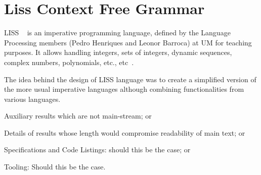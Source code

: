 \documentclass[
  oneside,
  11pt, a4paper,
  footinclude=true,
  headinclude=true,
  cleardoublepage=empty
]{scrbook}
\begin{document}

	

	
	
	
	\chapter{Liss Context Free Grammar}

	LISS ~\citep{CH07a} is an imperative programming language, defined by the Language Processing members (Pedro Henriques and Leonor Barroca) at UM for teaching purposes.
	It allows handling integers, sets of integers, dynamic sequences, complex numbers, polynomials, etc., etc~\citep{CH07d,CH07a,CH06a,CH06b,CH05a}.

	The idea behind the design of LISS language was to create a simplified version of the more usual imperative languages although combining functionalities from various languages.

	
	

	Auxiliary results which are not main-stream; or

	Details of results whose length would compromise readability of main text; or

	Specifications and Code Listings: should this be the case; or

	Tooling: Should this be the case.



\end{document}
